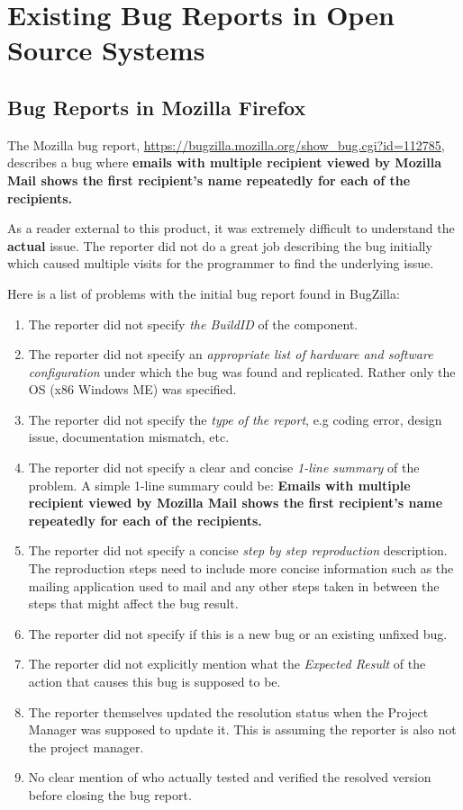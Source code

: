 \documentclass[fontsize=12pt,paper=letter,twoside]{scrartcl}
\begin{document}
\newpage
\section{Existing Bug Reports in Open Source Systems}

\subsection{Bug Reports in Mozilla Firefox}

The Mozilla bug report, \url{https://bugzilla.mozilla.org/show_bug.cgi?id=112785}, describes a bug where \textbf{emails with multiple recipient viewed by Mozilla Mail shows the first recipient's name repeatedly for each of the recipients.}

\smallskip

As a reader external to this product, it was extremely difficult to understand the \textbf{actual} issue. The reporter did not do a great job describing the bug initially which caused multiple visits for the programmer to find the underlying issue.

\bigskip

\noindent Here is a list of problems with the initial bug report found in BugZilla:
\begin{enumerate}
\item The reporter did not specify \emph{the BuildID} of the component.
\item The reporter did not specify an \emph{appropriate list of hardware and software configuration} under which the bug was found and replicated. Rather only the OS (x86 Windows ME) was specified.
\item The reporter did not specify the \emph{type of the report}, e.g coding error, design issue, documentation mismatch, etc.
\item The reporter did not specify a clear and concise \emph{1-line summary} of the problem. A simple 1-line summary could be: \textbf{Emails with multiple recipient viewed by Mozilla Mail shows the first recipient's name repeatedly for each of the recipients.}
\item The reporter did not specify a concise \emph{step by step reproduction} description. The reproduction steps need to include more concise information such as the mailing application used to mail and any other steps taken in between the steps that might affect the bug result.
\item The reporter did not specify if this is a new bug or an existing unfixed bug.
\item The reporter did not explicitly mention what the \emph{Expected Result} of the action that causes this bug is supposed to be.
\item The reporter themselves updated the resolution status when the Project Manager was supposed to update it. This is assuming the reporter is also not the project manager.
\item No clear mention of who actually tested and verified the resolved version before closing the bug report.
\end{enumerate}
\end{document}
